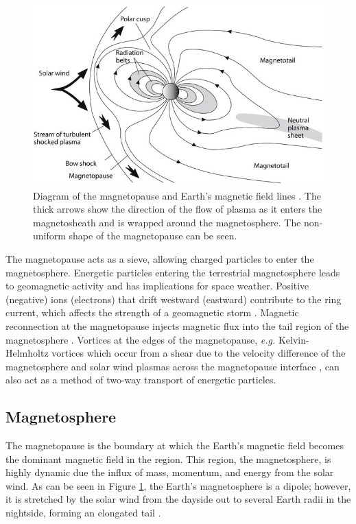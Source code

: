 \begin{figure}
    \centering
    \includegraphics[width=\linewidth]{Figures/The-magnetosphere-is-the-region-where-Earths-magnetic-field-predominates-The_W640.jpg}
    \caption[Diagram of the Earth's magnetopause and magnetic field lines.]{Diagram of the magnetopause and Earth's magnetic field lines \citep{Anderson:2018}. The thick arrows show the direction of the flow of plasma as it enters the magnetosheath and is wrapped around the magnetosphere. The non-uniform shape of the magnetopause can be seen.}
    \label{fig:magnetopause}
\end{figure}

The magnetopause acts as a sieve, allowing charged particles to enter the magnetosphere. Energetic particles entering the terrestrial magnetosphere leads to geomagnetic activity and has implications for space weather. Positive (negative) ions (electrons) that drift westward (eastward) contribute to the ring current, which affects the strength of a geomagnetic storm \citep{Williams:1981}. Magnetic reconnection at the magnetopause injects magnetic flux into the tail region of the magnetosphere \citep{Tsurutani:1990}. Vortices at the edges of the magnetopause, \textit{e.g.} Kelvin-Helmholtz vortices which occur from a shear due to the velocity difference of the magnetosphere and solar wind plasmas across the magnetopause interface \citep{Nykyri:2001}, can also act as a method of two-way transport of energetic particles.

\subsection{Magnetosphere}
The magnetopause is the boundary at which the Earth's magnetic field becomes the dominant magnetic field in the region. This region, the magnetosphere, is highly dynamic due the influx of mass, momentum, and energy from the solar wind. As can be seen in Figure \ref{fig:magnetopause}, the Earth's magnetosphere is a dipole; however, it is stretched by the solar wind from the dayside out to several Earth radii in the nightside, forming an elongated tail \citep{Borovsky:2018}. %

